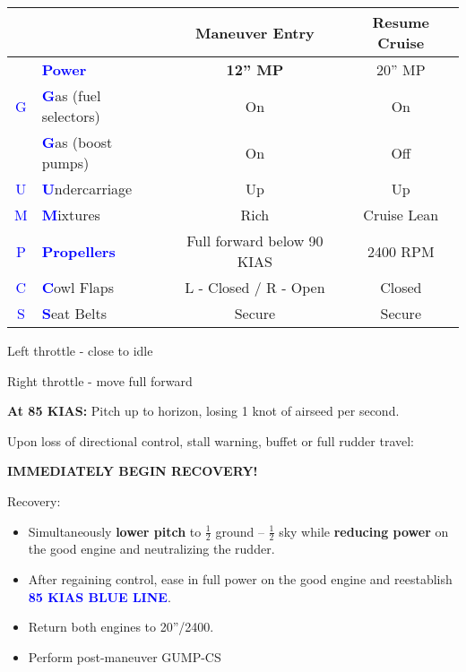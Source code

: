 {\begin{table}[H]
\centering
\begin{tabular}{|c|l|c|c|}
\hline
                    &                                                 & \textbf{Maneuver Entry} & \textbf{Resume Cruise} \\ \hline
                    & \textcolor{blue}{\textbf{Power}}                & \textbf{12'' MP}        & 20'' MP                \\ \hline
\textcolor{blue}{G} & \textcolor{blue}{\textbf{G}}as (fuel selectors) & On                      & On                     \\
                    & \textcolor{blue}{\textbf{G}}as (boost pumps)    & On                      & Off                    \\ \hline
\textcolor{blue}{U} & \textcolor{blue}{\textbf{U}}ndercarriage        & Up                      & Up                     \\ \hline
\textcolor{blue}{M} & \textcolor{blue}{\textbf{M}}ixtures             & Rich                    & Cruise Lean            \\ \hline
\textcolor{blue}{P} & \textcolor{blue}{\textbf{Propellers}}           & Full forward below 90 KIAS & 2400 RPM            \\ \hline
\textcolor{blue}{C} & \textcolor{blue}{\textbf{C}}owl Flaps           & L - Closed / R - Open   & Closed                 \\ \hline
\textcolor{blue}{S} & \textcolor{blue}{\textbf{S}}eat Belts           & Secure                  & Secure                 \\ \hline
\end{tabular}
\end{table}

Left throttle - close to idle

Right throttle - move full forward

\textbf{At 85 KIAS:} Pitch up to horizon, losing 1 knot of airseed per second.

Upon loss of directional control, stall warning, buffet or full rudder travel:

\textbf{IMMEDIATELY BEGIN RECOVERY!}

Recovery:
\begin{itemize}[label={}]
\item Simultaneously \textbf{lower pitch} to $\frac{1}{2}$ ground – $\frac{1}{2}$ sky while \textbf{reducing power} on the good engine and neutralizing the rudder.
\item After regaining control, ease in full power on the good engine and reestablish \textbf{\textcolor{blue}{85 KIAS BLUE LINE}}.
\item Return both engines to 20''/2400.
\item Perform post-maneuver GUMP-CS
\end{itemize}

}
